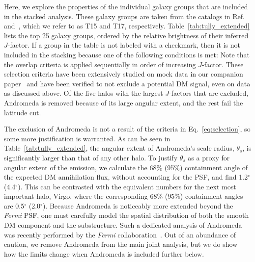   Here, we explore the properties of the individual galaxy groups that are included in the stacked analysis.  These galaxy groups are taken from the catalogs in Ref.~\cite{Tully:2015opa} and~\cite{2017ApJ...843...16K}, which we refer to as T15 and T17, respectively.  Table~\ref{tab:tully_extended} lists the top 25 galaxy groups, ordered by the relative brightness of their inferred $J$-factor.  If a group in the table is not labeled with a checkmark, then it is not included in the stacking because one of the following conditions is met:
Note that the overlap criteria is applied sequentially in order of increasing $J$-factor.
These selection criteria have been extensively studied on mock data in our companion paper~\cite{companion} and have been verified to not exclude a potential DM signal, even on data as discussed above. Of the five halos with the largest $J$-factors that are excluded, Andromeda is removed because of its large angular extent, and the rest fail the latitude cut. 

The exclusion of Andromeda is not a result of the criteria in Eq.~\ref{eq:selection}, so some more justification is warranted. As can be seen in Table~\ref{tab:tully_extended}, the angular extent of Andromeda's  scale radius, $\theta_{s}$, is significantly larger than that of any other halo.  To justify $\theta_{s}$ as a proxy for angular extent of the emission, we calculate the 68\% (95\%) containment angle of the expected DM annihilation flux, without accounting for the PSF, and find 1.2$^{\circ}$ (4.4$^{\circ}$). This can be contrasted with the equivalent numbers for the next most important halo, Virgo, where the corresponding  68\% (95\%) containment angles are 0.5$^{\circ}$ (2.0$^{\circ}$). 
Because Andromeda is noticeably more extended beyond the \textit{Fermi} PSF, one must carefully model the spatial distribution of both the smooth DM component and the substructure.  Such a dedicated analysis of Andromeda was recently performed by the \emph{Fermi} collaboration~\cite{Ackermann:2017nya}.  Out of an abundance of caution, we remove Andromeda from the main joint analysis, but we do show how the limits change when Andromeda is included further below.

